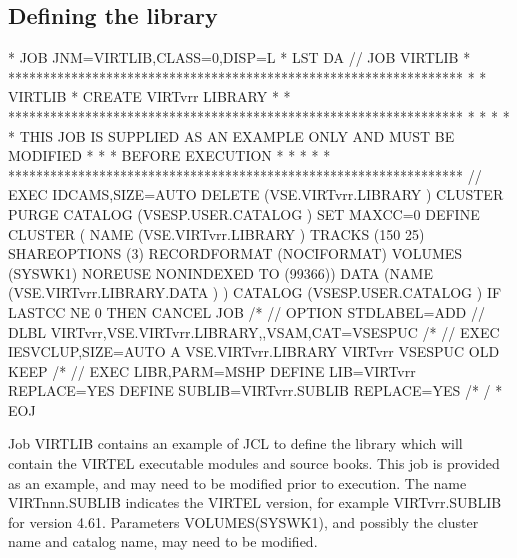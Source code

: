 \documentclass[letterpaper,10pt,english]{sphinxmanual}
\begin{document}
\subsection{Defining the library}
\label{\detokenize{Installation_Guide:defining-the-library}}
\begin{sphinxVerbatim}[commandchars=\\\{\}]
* \PYGZdl{}\PYGZdl{} JOB JNM=VIRTLIB,CLASS=0,DISP=L
* \PYGZdl{}\PYGZdl{} LST DA
// JOB VIRTLIB
* *****************************************************************
* * VIRTLIB * CREATE VIRTvrr LIBRARY                              *
* *****************************************************************
* *                                                               *
* * THIS JOB IS SUPPLIED AS AN EXAMPLE ONLY AND MUST BE MODIFIED  *
* * BEFORE EXECUTION                                              *
* *                                                               *
* *****************************************************************
// EXEC IDCAMS,SIZE=AUTO
 DELETE (VSE.VIRTvrr.LIBRARY ) \PYGZhy{}
          CLUSTER \PYGZhy{}
          PURGE \PYGZhy{}
    CATALOG (VSESP.USER.CATALOG )
 SET MAXCC=0
 DEFINE CLUSTER ( \PYGZhy{}
            NAME (VSE.VIRTvrr.LIBRARY ) \PYGZhy{}
            TRACKS (150 25) \PYGZhy{}
            SHAREOPTIONS (3) \PYGZhy{}
            RECORDFORMAT (NOCIFORMAT) \PYGZhy{}
            VOLUMES (SYSWK1) \PYGZhy{}
            NOREUSE \PYGZhy{}
            NONINDEXED \PYGZhy{}
            TO (99366)) \PYGZhy{}
            DATA (NAME (VSE.VIRTvrr.LIBRARY.DATA ) ) \PYGZhy{}
            CATALOG (VSESP.USER.CATALOG )
 IF LASTCC NE 0 THEN CANCEL JOB
/*
// OPTION STDLABEL=ADD
// DLBL VIRTvrr,\PYGZsq{}VSE.VIRTvrr.LIBRARY\PYGZsq{},,VSAM,CAT=VSESPUC
/*
// EXEC IESVCLUP,SIZE=AUTO
A VSE.VIRTvrr.LIBRARY        VIRTvrr VSESPUC OLD KEEP
/*
// EXEC LIBR,PARM=\PYGZsq{}MSHP\PYGZsq{}
              DEFINE LIB=VIRTvrr REPLACE=YES
              DEFINE SUBLIB=VIRTvrr.SUBLIB REPLACE=YES
/*
/\PYGZam{}
* \PYGZdl{}\PYGZdl{} EOJ
\end{sphinxVerbatim}

\sphinxAtStartPar
{}

\sphinxAtStartPar
Job VIRTLIB contains an example of JCL to define the library which will contain the VIRTEL executable modules and source books. This job is provided as an example, and may need to be modified prior to execution. The name VIRTnnn.SUBLIB indicates the VIRTEL version, for example VIRTvrr.SUBLIB for version 4.61. Parameters VOLUMES(SYSWK1), and possibly the cluster name and catalog name, may need to be modified.
\end{document}
